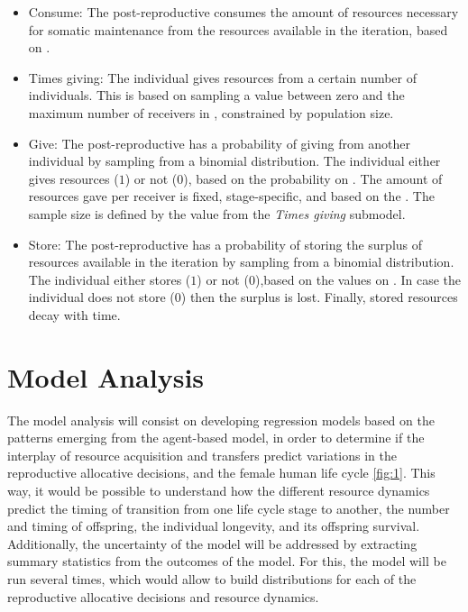 \documentclass{article}
\begin{document}
\begin{itemize}
\begin{itemize}
        \item Consume: The post-reproductive consumes the amount of resources necessary for somatic maintenance from the resources available in the iteration, based on \cite{kaplan2000theory}.
        \item Times giving: The individual gives resources from a certain number of individuals. This is based on sampling a value between zero and the maximum number of receivers in \cite{gurven2004give}, constrained by population size.
        \item Give: The post-reproductive has a probability of giving from another individual by sampling from a binomial distribution. The individual either gives resources ($1$) or not ($0$), based on the probability on \cite{gurven2004give}. The amount of resources gave per receiver is fixed, stage-specific, and based on the \cite{gurven2004give}. The sample size is defined by the value from the \emph{Times giving} submodel. 
        \item Store: The post-reproductive has a probability of storing the surplus of resources available in the iteration by sampling from a binomial distribution. The individual either stores ($1$) or not ($0$),based on the values on \citep{bowles2011cultivation}. In case the individual does not store ($0$) then the surplus is lost. Finally, stored resources decay with time.
    \end{itemize}
\end{itemize}

\section{Model Analysis}

The model analysis will consist on developing regression models based on the patterns emerging from the agent-based model, in order to determine if the interplay of resource acquisition and transfers predict variations in the reproductive allocative decisions, and the female human life cycle \ref{fig:1}. This way, it would be possible to understand how the different resource dynamics predict the timing of transition from one life cycle stage to another, the number and timing of offspring, the individual longevity, and its offspring survival. Additionally, the uncertainty of the model will be addressed by extracting summary statistics from the outcomes of the model. For this, the model will be run several times, which would allow to build distributions for each of the reproductive allocative decisions and resource dynamics.
\end{document}
